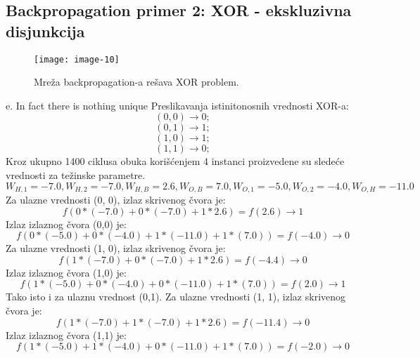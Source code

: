 \documentclass[fontsize=11bp, paper=a4]{scrarticle}
\begin{document}
\subsection{Backpropagation primer 2: XOR - ekskluzivna disjunkcija}
\begin{figure}[h!]
    \centering
    \texttt{[image: image-10]}
    \caption{Mreža backpropagation-a rešava XOR problem.}
\end{figure}
e. In fact there is nothing unique
Preslikavanja istinitonosnih vrednosti XOR-a:
$$
(0,0) \rightarrow 0;
$$
$$
(0,1) \rightarrow 1;
$$
$$
(1,0) \rightarrow 1;
$$
$$
(1,1) \rightarrow 0;
$$
Kroz ukupno 1400 ciklusa obuka korišćenjem 4 instanci proizvedene su sledeće vrednosti za težinske parametre.
$$
W_{H,1} = -7.0,
W_{H,2} = -7.0,
W_{H,B} = 2.6,
W_{O,B} = 7.0,
W_{O,1} = -5.0,
W_{O,2} = -4.0,
W_{O,H} = -11.0
$$
Za ulazne vrednosti (0, 0), izlaz skrivenog čvora je:
$$f(0*(-7.0) + 0*(-7.0) + 1*2.6) = f(2.6) \rightarrow 1$$
Izlaz izlaznog čvora (0,0) je:
$$f(0*(-5.0) + 0*(-4.0) + 1*(-11.0) + 1*(7.0)) = f(-4.0) \rightarrow 0$$
Za ulazne vrednosti (1, 0), izlaz skrivenog čvora je:
$$
f(1*(-7.0) + 0*(-7.0) + 1*2.6) = f(-4.4) \rightarrow 0
$$
Izlaz izlaznog čvora (1,0) je:
$$
f(1*(-5.0) + 0*(-4.0) + 0*(-11.0) + 1*(7.0)) = f(2.0) \rightarrow 1
$$
Tako isto i za ulaznu vrednost (0,1).
Za ulazne vrednosti (1, 1), izlaz skrivenog čvora je:
$$
f(1*(-7.0) + 1*(-7.0) + 1*2.6) = f(-11.4) \rightarrow 0
$$
Izlaz izlaznog čvora (1,1) je:
$$
f(1*(-5.0) + 1*(-4.0) + 0*(-11.0) + 1*(7.0)) = f(-2.0) \rightarrow 0
$$
\end{document}
